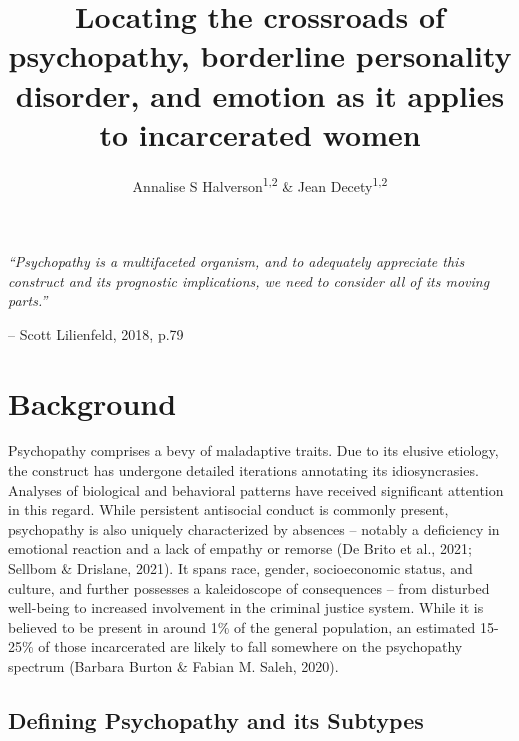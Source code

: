 \documentclass[
  man,floatsintext]{apa7}
\title{Locating the crossroads of psychopathy, borderline personality disorder, and emotion as it applies to incarcerated women}
\author{Annalise S Halverson\textsuperscript{1,2} \& Jean Decety\textsuperscript{1,2}}
\date{}
\affiliation{\vspace{0.5cm}\textsuperscript{1} University of Chicago\\\textsuperscript{2} Department of Psychology}
\begin{document}
\maketitle

\emph{``Psychopathy is a multifaceted organism, and to adequately appreciate this construct and its prognostic implications, we need to consider all of its moving parts.''}

-- Scott Lilienfeld, 2018, p.79

\hypertarget{background}{%
\section{Background}\label{background}}

Psychopathy comprises a bevy of maladaptive traits. Due to its elusive etiology, the construct has undergone detailed iterations annotating its idiosyncrasies. Analyses of biological and behavioral patterns have received significant attention in this regard. While persistent antisocial conduct is commonly present, psychopathy is also uniquely characterized by absences -- notably a deficiency in emotional reaction and a lack of empathy or remorse (De Brito et al., 2021; Sellbom \& Drislane, 2021). It spans race, gender, socioeconomic status, and culture, and further possesses a kaleidoscope of consequences -- from disturbed well-being to increased involvement in the criminal justice system. While it is believed to be present in around 1\% of the general population, an estimated 15-25\% of those incarcerated are likely to fall somewhere on the psychopathy spectrum (Barbara Burton \& Fabian M. Saleh, 2020).

\hypertarget{defining-psychopathy-and-its-subtypes}{%
\subsection{Defining Psychopathy and its Subtypes}\label{defining-psychopathy-and-its-subtypes}}
\end{document}
